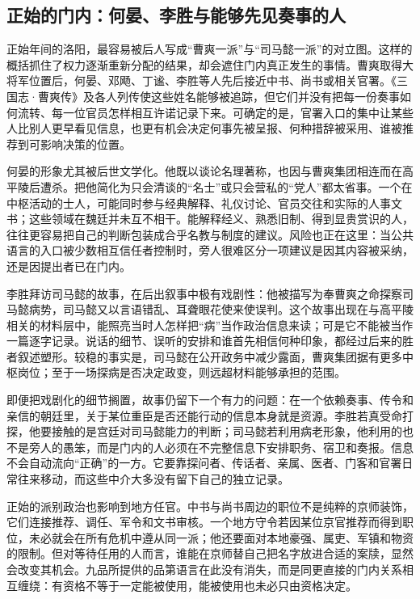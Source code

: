 \subsection{正始的门内：何晏、李胜与能够先见奏事的人}

正始年间的洛阳，最容易被后人写成“曹爽一派”与“司马懿一派”的对立图。这样的概括抓住了权力逐渐重新分配的结果，却会遮住门内真正发生的事情。曹爽取得大将军位置后，何晏、邓飏、丁谧、李胜等人先后接近中书、尚书或相关官署。《三国志·曹爽传》及各人列传使这些姓名能够被追踪，但它们并没有把每一份奏事如何流转、每一位官员怎样相互许诺记录下来。可确定的是，官署入口的集中让某些人比别人更早看见信息，也更有机会决定何事先被呈报、何种措辞被采用、谁被推荐到可影响决策的位置。

何晏的形象尤其被后世文学化。他既以谈论名理著称，也因与曹爽集团相连而在高平陵后遭杀。把他简化为只会清谈的“名士”或只会营私的“党人”都太省事。一个在中枢活动的士人，可能同时参与经典解释、礼仪讨论、官员交往和实际的人事文书；这些领域在魏廷并未互不相干。能解释经义、熟悉旧制、得到显贵赏识的人，往往更容易把自己的判断包装成合乎名教与制度的建议。风险也正在这里：当公共语言的入口被少数相互信任者控制时，旁人很难区分一项建议是因其内容被采纳，还是因提出者已在门内。

李胜拜访司马懿的故事，在后出叙事中极有戏剧性：他被描写为奉曹爽之命探察司马懿病势，司马懿又以言语错乱、耳聋眼花使来使误判。这个故事出现在与高平陵相关的材料层中，能照亮当时人怎样把“病”当作政治信息来读；可是它不能被当作一篇逐字记录。说话的细节、误听的安排和谁首先相信何种印象，都经过后来的胜者叙述塑形。较稳的事实是，司马懿在公开政务中减少露面，曹爽集团据有更多中枢岗位；至于一场探病是否决定政变，则远超材料能够承担的范围。

即便把戏剧化的细节搁置，故事仍留下一个有力的问题：在一个依赖奏事、传令和亲信的朝廷里，关于某位重臣是否还能行动的信息本身就是资源。李胜若真受命打探，他要接触的是宫廷对司马懿能力的判断；司马懿若利用病老形象，他利用的也不是旁人的愚笨，而是门内的人必须在不完整信息下安排职务、宿卫和奏报。信息不会自动流向“正确”的一方。它要靠探问者、传话者、亲属、医者、门客和官署日常往来移动，而这些中介大多没有留下自己的独立记录。

正始的派别政治也影响到地方任官。中书与尚书周边的职位不是纯粹的京师装饰，它们连接推荐、调任、军令和文书审核。一个地方守令若因某位京官推荐而得到职位，未必就会在所有危机中遵从同一派；他还要面对本地豪强、属吏、军镇和物资的限制。但对等待任用的人而言，谁能在京师替自己把名字放进合适的案牍，显然会改变其机会。九品所提供的品第语言在此没有消失，而是同更直接的门内关系相互缠绕：有资格不等于一定能被使用，能被使用也未必只由资格决定。

